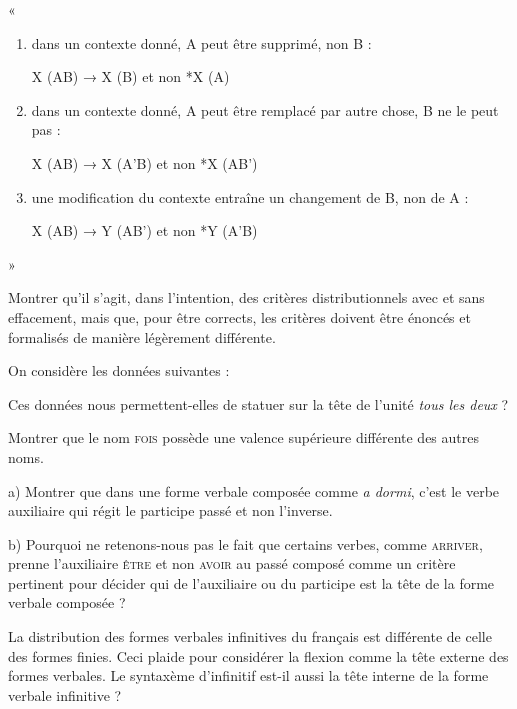 {        «\begin{enumerate}
        \item dans un contexte donné, A peut être supprimé, non B :

        X (AB) → X (B) et non *X (A)

       \item dans un contexte donné, A peut être remplacé par autre chose, B ne le peut pas :

        X (AB) → X (A’B) et non *X (AB’)

       \item une modification du contexte entraîne un changement de B, non de A :

        X (AB) → Y (AB’) et non *Y (A’B)
        \end{enumerate} »

    Montrer qu’il s’agit, dans l’intention, des critères distributionnels avec et sans effacement, mais que, pour être corrects, les critères doivent être énoncés et formalisés de manière légèrement différente.

     On considère les données suivantes :
    
    \ea
     \z
    \z

    Ces données nous permettent-elles de statuer sur la tête de l’unité \textit{tous les deux} ?

     Montrer que le nom \textsc{fois} possède une valence supérieure différente des autres noms.

     a) Montrer que dans une forme verbale composée comme \textit{a dormi}, c’est le verbe auxiliaire qui régit le participe passé et non l’inverse.

    b) Pourquoi ne retenons-nous pas le fait que certains verbes, comme \textsc{arriver}, prenne l’auxiliaire \textsc{être} et non \textsc{avoir} au passé composé comme un critère pertinent pour décider qui de l’auxiliaire ou du participe est la tête de la forme verbale composée ?

     La distribution des formes verbales infinitives du français est différente de celle des formes finies. Ceci plaide pour considérer la flexion comme la tête externe des formes verbales. Le syntaxème d’infinitif est-il aussi la tête interne de la forme verbale infinitive ?

}

